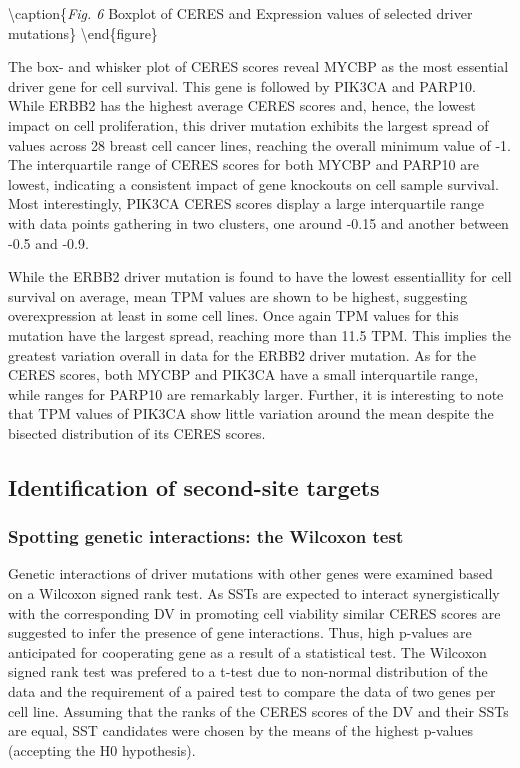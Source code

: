 \documentclass[]{article}
\begin{document}
\textbackslash caption\{\emph{Fig. 6} Boxplot of CERES and Expression
values of selected driver mutations\}\label{fig:data visualisation2}
\textbackslash end\{figure\}

The box- and whisker plot of CERES scores reveal MYCBP as the most
essential driver gene for cell survival. This gene is followed by PIK3CA
and PARP10. While ERBB2 has the highest average CERES scores and, hence,
the lowest impact on cell proliferation, this driver mutation exhibits
the largest spread of values across 28 breast cell cancer lines,
reaching the overall minimum value of -1. The interquartile range of
CERES scores for both MYCBP and PARP10 are lowest, indicating a
consistent impact of gene knockouts on cell sample survival. Most
interestingly, PIK3CA CERES scores display a large interquartile range
with data points gathering in two clusters, one around -0.15 and another
between -0.5 and -0.9.

While the ERBB2 driver mutation is found to have the lowest
essentiallity for cell survival on average, mean TPM values are shown to
be highest, suggesting overexpression at least in some cell lines. Once
again TPM values for this mutation have the largest spread, reaching
more than 11.5 TPM. This implies the greatest variation overall in data
for the ERBB2 driver mutation. As for the CERES scores, both MYCBP and
PIK3CA have a small interquartile range, while ranges for PARP10 are
remarkably larger. Further, it is interesting to note that TPM values of
PIK3CA show little variation around the mean despite the bisected
distribution of its CERES scores.

\hypertarget{identification-of-second-site-targets}{%
\subsection{Identification of second-site
targets}\label{identification-of-second-site-targets}}

\hypertarget{spotting-genetic-interactions-the-wilcoxon-test}{%
\subsubsection{Spotting genetic interactions: the Wilcoxon
test}\label{spotting-genetic-interactions-the-wilcoxon-test}}

Genetic interactions of driver mutations with other genes were examined
based on a Wilcoxon signed rank test. As SSTs are expected to interact
synergistically with the corresponding DV in promoting cell viability
similar CERES scores are suggested to infer the presence of gene
interactions. Thus, high p-values are anticipated for cooperating gene
as a result of a statistical test. The Wilcoxon signed rank test was
prefered to a t-test due to non-normal distribution of the data and the
requirement of a paired test to compare the data of two genes per cell
line. Assuming that the ranks of the CERES scores of the DV and their
SSTs are equal, SST candidates were chosen by the means of the highest
p-values (accepting the H0 hypothesis).
\end{document}

